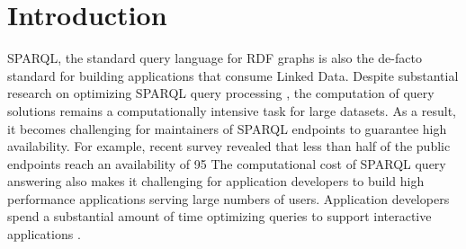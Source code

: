 \section{Introduction}
SPARQL, the standard query language for RDF graphs is also the de-facto standard for building applications that consume Linked Data. 
Despite substantial research on optimizing SPARQL query processing \cite{Pham2013}, the computation of query solutions remains a computationally intensive task for large datasets.
As a result, it becomes challenging for maintainers of SPARQL endpoints to guarantee high availability.
For example, recent survey \cite{buil2013sparql} revealed that less than half of the public endpoints reach an availability of 95%
The computational cost of SPARQL query answering also makes it challenging for application developers to build high performance applications serving large numbers of users.
Application developers spend a substantial amount of time optimizing queries to support interactive applications \cite{Loizou_Angles_Groth_2014}.